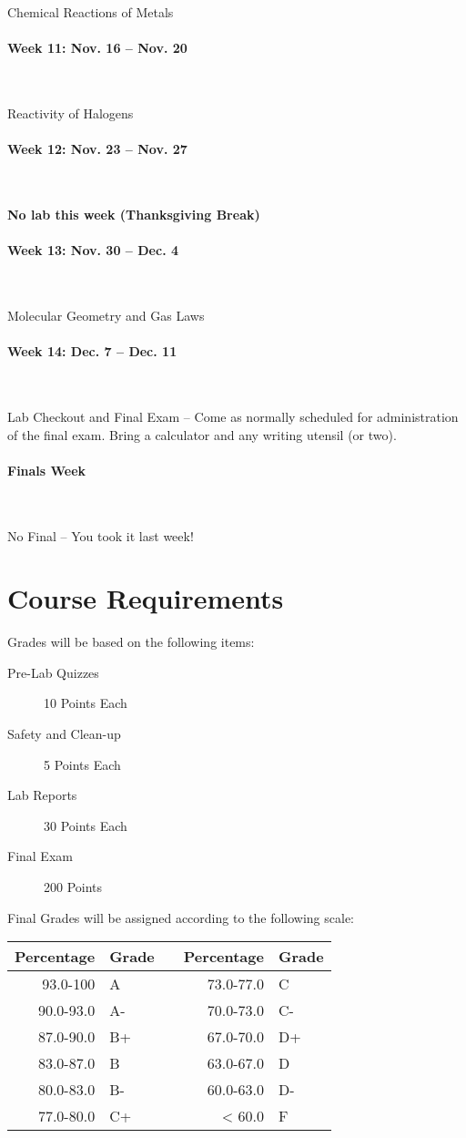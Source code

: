 \documentclass[12pt, letterpaper]{article}
\begin{document}
Chemical Reactions of Metals

\paragraph{Week 11: Nov. 16 -- Nov. 20}~

Reactivity of Halogens

\paragraph{Week 12: Nov. 23 -- Nov. 27}~

\textbf{No lab this week (Thanksgiving Break)}

\paragraph{Week 13: Nov. 30 -- Dec. 4}~

Molecular Geometry and Gas Laws

\paragraph{Week 14: Dec. 7 -- Dec. 11}~

Lab Checkout and Final Exam -- Come as normally scheduled for administration of the final exam. Bring a calculator and any writing utensil (or two).

\paragraph{Finals Week}~

No Final -- You took it last week!

\section*{Course Requirements}
Grades will be based on the following items:
\begin{description}
  \item[Pre-Lab Quizzes] 10 Points Each
  \item[Safety and Clean-up] 5 Points Each
  \item[Lab Reports] 30 Points Each
  \item[Final Exam] 200 Points
\end{description}
Final Grades will be assigned according to the following scale:

\begin{tabular}{rl|c|rl}
	Percentage & Grade &  & Percentage & Grade \\ \midrule
	  93.0-100 & A     &  &  73.0-77.0 & C     \\
	 90.0-93.0 & A-    &  &  70.0-73.0 & C-    \\
	 87.0-90.0 & B+    &  &  67.0-70.0 & D+    \\
	 83.0-87.0 & B     &  &  63.0-67.0 & D     \\
	 80.0-83.0 & B-    &  &  60.0-63.0 & D-    \\
	 77.0-80.0 & C+    &  &     < 60.0 & F
\end{tabular}
\end{document}
